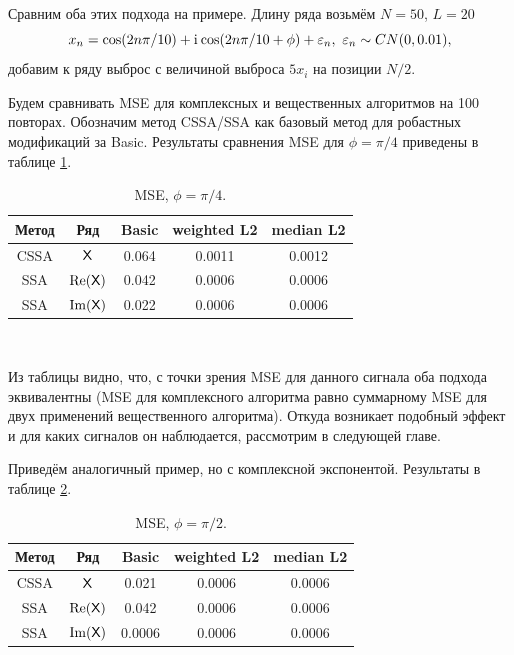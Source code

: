 \documentclass[specialist,
               substylefile = spbu.rtx,
               subf,href,colorlinks=true, 12pt]{disser}
\begin{document}
Сравним оба этих подхода на примере.
Длину ряда возьмём $N = 50$, $L = 20$
$$x_n = \cos(2n\pi/10) + \mathrm{i}\mkern1mu\cos(2n\pi/10 + \phi) + \varepsilon_n, ~ \varepsilon_n \sim CN(0,0.01),$$
добавим к ряду выброс с величиной выброса $5x_i$ на позиции $N/2$.

Будем сравнивать MSE для комплексных и вещественных алгоритмов на 100 повторах.
Обозначим метод CSSA/SSA как базовый метод для робастных модификаций за Basic.
Результаты сравнения MSE для $\phi = \pi / 4$ приведены в таблице \ref{tab:th_ex}.
\begin{table}[H]
	\caption{MSE, $\phi = \pi / 4$.}
	\label{tab:th_ex}
	\begin{center}
		\begin{tabular}{|c|c|c|c|c|}
			\hline
			Метод & Ряд & Basic & weighted L2 & median L2\\
			\hline
			CSSA & $\textsf{X}$ & 0.064 & 0.0011 & 0.0012\\
			\hline
			SSA & $\Re(\textsf{X})$ & 0.042 & 0.0006 &   0.0006\\
			\hline
			SSA & $\Im(\textsf{X})$ & 0.022   & 0.0006 &   0.0006\\
			\hline
		\end{tabular} \\
	\end{center}
\end{table}

Из таблицы видно, что, с точки зрения MSE для данного сигнала оба подхода эквивалентны (MSE для комплексного алгоритма равно суммарному MSE для двух применений вещественного алгоритма). Откуда возникает подобный эффект и для каких сигналов он наблюдается, рассмотрим в следующей главе.

Приведём аналогичный пример, но с комплексной экспонентой. Результаты в таблице \ref{tab:th_ex_exp}.

\begin{table}[H]
	\caption{MSE, $\phi = \pi / 2$.}
	\label{tab:th_ex_exp}
	\begin{center}
		\begin{tabular}{|c|c|c|c|c|}
			\hline
			Метод & Ряд & Basic & weighted L2 & median L2 \\
			\hline
			CSSA & $\textsf{X}$ & 0.021 & 0.0006 & 0.0006\\
			\hline
			SSA & $\Re(\textsf{X})$ & 0.042 & 0.0006 &   0.0006\\
			\hline
			SSA & $\Im(\textsf{X})$ & 0.0006   & 0.0006 &   0.0006\\
			\hline
		\end{tabular} \\
	\end{center}
\end{table}
\end{document}
